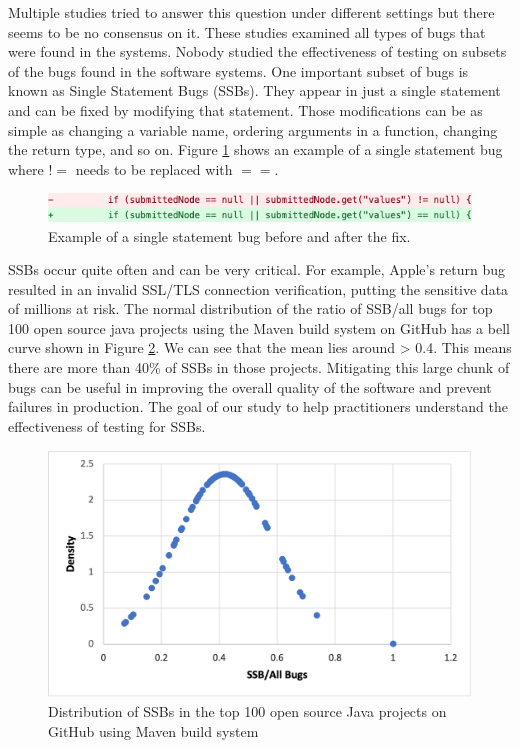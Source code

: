 \documentclass[sigconf,nonacm]{acmart}
\begin{document}
Multiple studies tried to answer this question under different settings but there seems to be no consensus on it. These studies examined all types of bugs that were found in the systems. Nobody studied the effectiveness of testing on subsets of the bugs found in the software systems. One important subset of bugs is known as Single Statement Bugs (SSBs). They appear in just a single statement and can be fixed by modifying that statement. Those modifications can be as simple as changing a variable name, ordering arguments in a function, changing the return type, and so on. Figure \ref{fig:ssb} shows an example of a single statement bug where $!=$ needs to be replaced with $==$.

\begin{figure}[h]
    \centering
    \includegraphics[width=1.0\linewidth]{img/diff.png}
    \caption{Example of a single statement bug before and after the fix.}
    \label{fig:ssb}
\end{figure}

SSBs occur quite often \cite{sstubs} and can be very critical. For example, Apple’s return bug resulted in an invalid SSL/TLS connection verification, putting the sensitive data of millions at risk. The normal distribution of the ratio of SSB/all bugs for top 100 open source java projects using the Maven build system on GitHub has a bell curve shown in Figure \ref{fig:density}. We can see that the mean lies around > 0.4. This means there are more than 40\% of SSBs in those projects. Mitigating this large chunk of bugs can be useful in improving the overall quality of the software and prevent failures in production. The goal of our study to help practitioners understand the effectiveness of testing for SSBs.

\begin{figure}[h]
	\centering
	\includegraphics[width=\linewidth]{img/occurrence_of_stub.png}
	\caption{Distribution of SSBs in the top 100 open source Java projects on GitHub using Maven build system}
	\label{fig:density}
\end{figure}
\end{document}
